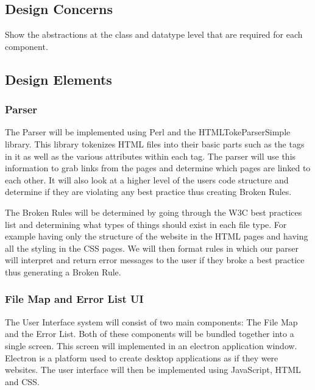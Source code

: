 \documentclass[letterpaper,10pt,titlepage,draftclsnofoot,onecolumn,onesided] {IEEEtran}
\begin{document}
\subsection{Design Concerns}
Show the abstractions at the class and datatype level that are required for each component. 
\subsection{Design Elements}


	\subsubsection{Parser}
	The Parser will be implemented using Perl and the HTMLTokeParserSimple library\cite{htmltokeparser}.
	This library tokenizes HTML files into their basic parts such as the tags in it as well as the various attributes within each tag.
	The parser will use this information to grab links from the pages and determine which pages are linked to each other.
	It will also look at a higher level of the users code structure and determine if they are violating any best practice thus creating Broken Rules. 
	
	The Broken Rules will be determined by going through the W3C best practices list and determining what types of things should exist in each file type. For example having only the structure of the website in the HTML pages and having all the styling in the CSS pages. We will then format rules in which our parser will interpret and return error messages to the user if they broke a best practice thus generating a Broken Rule.\cite{w3c}
	

	\subsubsection{File Map and Error List UI}
	The User Interface system will consist of two main components: The File Map and the Error List. 
	Both of these components will be bundled together into a single screen. 
	This screen will implemented in an electron application window. 
	Electron is a platform used to create desktop applications as if they were websites.
	The user interface will then be implemented using JavaScript, HTML and CSS.
	
\end{document}
